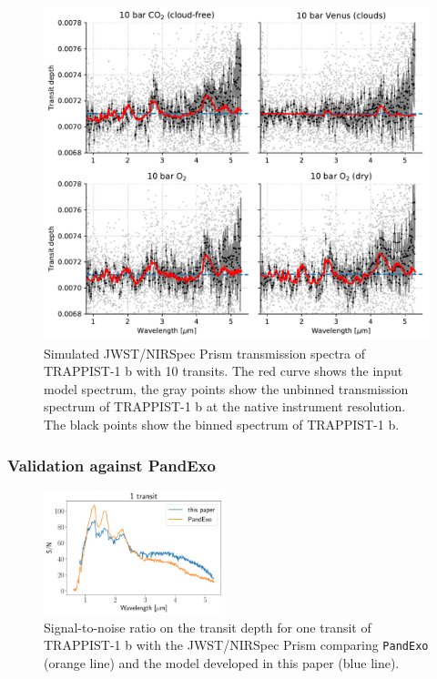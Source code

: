 \begin{figure}
    \centering
    \includegraphics[scale=0.8]{libra/smart.pdf}
    \caption{Simulated JWST/NIRSpec Prism transmission spectra of TRAPPIST-1 b with 10 transits. The red curve shows the input model spectrum, the gray points show the unbinned transmission spectrum of TRAPPIST-1 b at the native instrument resolution. The black points show the binned spectrum of TRAPPIST-1 b.}
    \label{fig:my_label}
\end{figure}

\subsubsection{Validation against PandExo}

\begin{figure}
\centering
\includegraphics[width=0.47\textwidth]{libra/pandexo_libra_compare.pdf}
\caption{Signal-to-noise ratio on the transit depth for one transit of TRAPPIST-1 b with the JWST/NIRSpec Prism comparing \texttt{PandExo} (orange line) and the model developed in this paper (blue line).}
\label{fig:pandexo_snr}
\end{figure}

